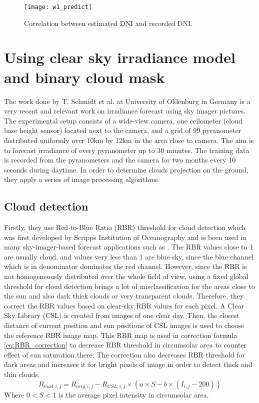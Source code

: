 \begin{figure}[h]
\caption{Correlation between estimated DNI and recorded DNI.}
\label{fig:w1_predict}
\texttt{[image: w1\_predict]}
\centering
\end{figure} 

\section{Using clear sky irradiance model and binary cloud mask}
The work done by T. Schmidt et al.\cite{tSchmidt_full} at University of Oldenburg in Germany is a very recent and relevant work on irradiance forecast using sky imager pictures. The experimental setup consists of a wide-view camera, one ceilometer (cloud base height sensor) located next to the camera, and a grid of 99 pyranometer distributed uniformly over 10km by 12km in the area close to camera. The aim is to forecast irradiance of every pyranometer up to 30 minutes. The training data is recorded from the pyranometers and the camera for two months every 10 seconds during daytime.
In order to determine clouds projection on the ground, they apply a series of image processing algorithms. 
\subsection{Cloud detection}
Firstly, they use Red-to-Blue Ratio (RBR) threshold for cloud detection which was first developed by Scripps Institution of Oceanography \cite{RBR89, RBR98} and is been used in many sky-imager-based forecast applications such as \cite{cloud_detection_using_RBR}.  The RBR values close to 1 are usually cloud, and values very less than 1 are blue sky, since the blue channel which is in denominator dominates the red channel. However, since the RBR is not homogeneously distributed over the whole field of view, using a fixed global threshold for cloud detection brings a lot of misclassification for the areas close to the sun and also dark thick clouds or very transparent clouds. Therefore, they correct the RBR values based on clear-sky RBR values for each pixel. A Clear Sky Library (CSL) is created from images of one clear day. Then, the closest distance of current position and sun positions of CSL images is used to choose the reference RBR image map. This RBR map is used in correction formula \ref{eq:RBR_correction} to decrease RBR threshold in circumsolar area to counter effect of sun saturation there. The correction also decreases RBR threshold for dark areas and increases it for bright pixels of image in order to detect thick and thin clouds.
\begin{equation}
\label{eq:RBR_correction}
R_{mod,i,j} =  R_{orig,i,j} - R_{CSL,i,j} \times (a \times S - b \times (I_{i,j} - 200))
\end{equation}
Where $0<S<1$ is the average pixel intensity in circumsolar area.

